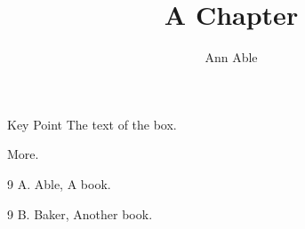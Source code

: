 \documentclass{svmult}
\begin{document}
\title*{A Chapter}
\author{Ann Able}
\maketitle
\begin{important}{Key Point}
The text of the box.
\end{important}
 More.
\begin{thebibliography}{9}
 A. Able, A book.
\end{thebibliography}
\begin{thebibliography}{9}
 B. Baker, Another book.
\end{thebibliography}
\end{document}

